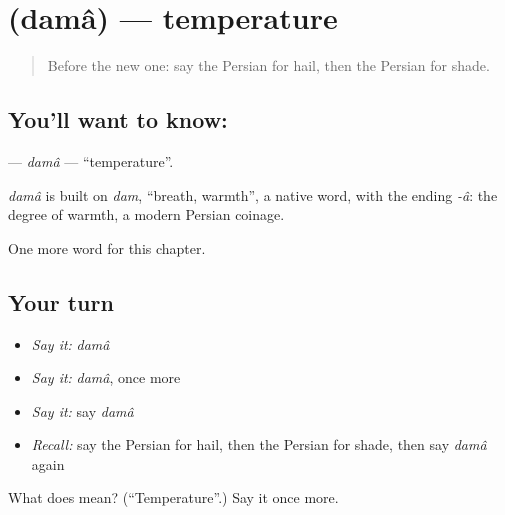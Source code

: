 \section[\texorpdfstring{\fa{دما} (damâ)}{دما (damâ)}]{ (damâ) — temperature}

\label{lesson:FA-C208-dama}



\begin{quote}
Before the new one: say the Persian for hail, then the Persian for shade.
\end{quote}

\subsection*{You'll want to know: }
\textbf{} — \emph{damâ} — \textquotedblleft{}temperature\textquotedblright{}.

\begin{cousinweb}
\emph{damâ} is built on \emph{dam}, \textquotedblleft{}breath, warmth\textquotedblright{}, a native word, with the ending \emph{-â}: the degree of warmth, a modern Persian coinage.
\end{cousinweb}

\begin{grammarlens}[title={What you've built}]
One more word for this chapter.
\end{grammarlens}

\subsection*{Your turn}
\begin{itemize}
\raggedright
  \item \emph{Say it:} \emph{damâ}
  \item \emph{Say it:} \emph{damâ}, once more
  \item \emph{Say it:} say \emph{damâ}
  \item \emph{Recall:} say the Persian for hail, then the Persian for shade, then say \emph{damâ} again
\end{itemize}

\begin{tcolorbox}[breakable,colback=teal!4,colframe=teal!35!black,title={Before you move on}]
What does  mean? (\textquotedblleft{}Temperature\textquotedblright{}.) Say it once more.
\end{tcolorbox}
